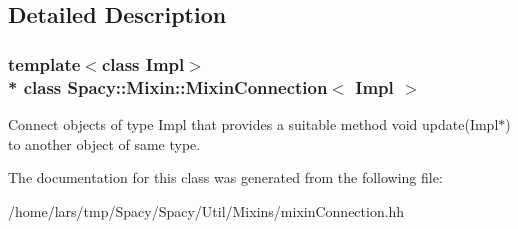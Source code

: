 \subsection{Detailed Description}
\subsubsection*{template$<$class Impl$>$\\*
class Spacy\+::\+Mixin\+::\+Mixin\+Connection$<$ Impl $>$}

Connect objects of type Impl that provides a suitable method void update(\+Impl$\ast$) to another object of same type. 

The documentation for this class was generated from the following file\+:\begin{DoxyCompactItemize}
\item 
/home/lars/tmp/\+Spacy/\+Spacy/\+Util/\+Mixins/mixin\+Connection.\+hh\end{DoxyCompactItemize}
